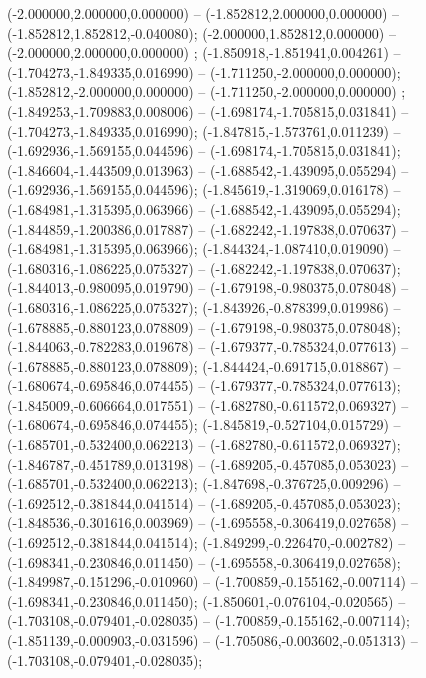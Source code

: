  (-2.000000,2.000000,0.000000) -- (-1.852812,2.000000,0.000000) -- (-1.852812,1.852812,-0.040080);
 (-2.000000,1.852812,0.000000) -- (-2.000000,2.000000,0.000000) ;
 (-1.850918,-1.851941,0.004261) -- (-1.704273,-1.849335,0.016990) -- (-1.711250,-2.000000,0.000000);
 (-1.852812,-2.000000,0.000000) -- (-1.711250,-2.000000,0.000000) ;
 (-1.849253,-1.709883,0.008006) -- (-1.698174,-1.705815,0.031841) -- (-1.704273,-1.849335,0.016990);
 (-1.847815,-1.573761,0.011239) -- (-1.692936,-1.569155,0.044596) -- (-1.698174,-1.705815,0.031841);
 (-1.846604,-1.443509,0.013963) -- (-1.688542,-1.439095,0.055294) -- (-1.692936,-1.569155,0.044596);
 (-1.845619,-1.319069,0.016178) -- (-1.684981,-1.315395,0.063966) -- (-1.688542,-1.439095,0.055294);
 (-1.844859,-1.200386,0.017887) -- (-1.682242,-1.197838,0.070637) -- (-1.684981,-1.315395,0.063966);
 (-1.844324,-1.087410,0.019090) -- (-1.680316,-1.086225,0.075327) -- (-1.682242,-1.197838,0.070637);
 (-1.844013,-0.980095,0.019790) -- (-1.679198,-0.980375,0.078048) -- (-1.680316,-1.086225,0.075327);
 (-1.843926,-0.878399,0.019986) -- (-1.678885,-0.880123,0.078809) -- (-1.679198,-0.980375,0.078048);
 (-1.844063,-0.782283,0.019678) -- (-1.679377,-0.785324,0.077613) -- (-1.678885,-0.880123,0.078809);
 (-1.844424,-0.691715,0.018867) -- (-1.680674,-0.695846,0.074455) -- (-1.679377,-0.785324,0.077613);
 (-1.845009,-0.606664,0.017551) -- (-1.682780,-0.611572,0.069327) -- (-1.680674,-0.695846,0.074455);
 (-1.845819,-0.527104,0.015729) -- (-1.685701,-0.532400,0.062213) -- (-1.682780,-0.611572,0.069327);
 (-1.846787,-0.451789,0.013198) -- (-1.689205,-0.457085,0.053023) -- (-1.685701,-0.532400,0.062213);
 (-1.847698,-0.376725,0.009296) -- (-1.692512,-0.381844,0.041514) -- (-1.689205,-0.457085,0.053023);
 (-1.848536,-0.301616,0.003969) -- (-1.695558,-0.306419,0.027658) -- (-1.692512,-0.381844,0.041514);
 (-1.849299,-0.226470,-0.002782) -- (-1.698341,-0.230846,0.011450) -- (-1.695558,-0.306419,0.027658);
 (-1.849987,-0.151296,-0.010960) -- (-1.700859,-0.155162,-0.007114) -- (-1.698341,-0.230846,0.011450);
 (-1.850601,-0.076104,-0.020565) -- (-1.703108,-0.079401,-0.028035) -- (-1.700859,-0.155162,-0.007114);
 (-1.851139,-0.000903,-0.031596) -- (-1.705086,-0.003602,-0.051313) -- (-1.703108,-0.079401,-0.028035);

